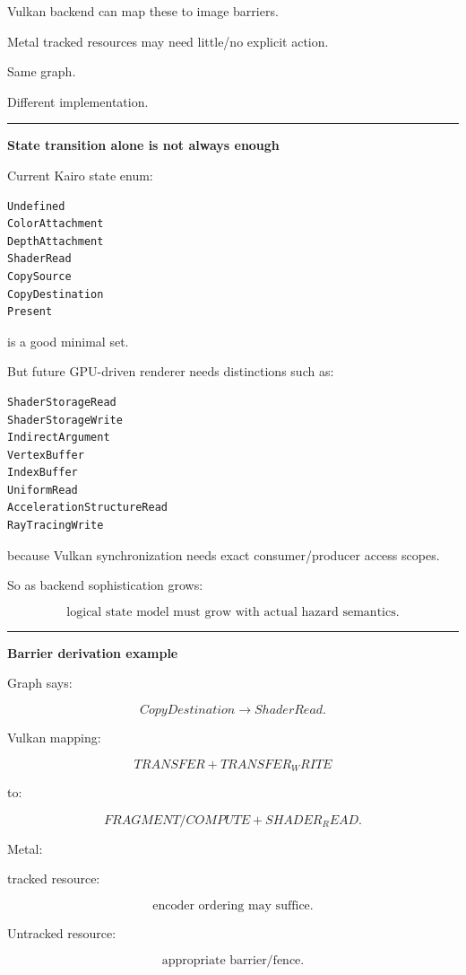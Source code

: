 Vulkan backend can map these to image barriers.

Metal tracked resources may need little/no explicit action.

Same graph.

Different implementation.

\begin{center}\rule{0.5\linewidth}{0.5pt}\end{center}

\textbf{State transition alone is not always enough}

Current Kairo state enum:

\begin{verbatim}
Undefined
ColorAttachment
DepthAttachment
ShaderRead
CopySource
CopyDestination
Present
\end{verbatim}

is a good minimal set.

But future GPU-driven renderer needs distinctions such as:

\begin{verbatim}
ShaderStorageRead
ShaderStorageWrite
IndirectArgument
VertexBuffer
IndexBuffer
UniformRead
AccelerationStructureRead
RayTracingWrite
\end{verbatim}

because Vulkan synchronization needs exact consumer/producer access scopes.

So as backend sophistication grows:

\[
\boxed{
\text{logical state model must grow with actual hazard semantics}.
}
\]

\begin{center}\rule{0.5\linewidth}{0.5pt}\end{center}

\textbf{Barrier derivation example}

Graph says:

\[
CopyDestination
\rightarrow
ShaderRead.
\]

Vulkan mapping:

\[
TRANSFER
+
TRANSFER_WRITE
\]

to:

\[
FRAGMENT/COMPUTE
+
SHADER_READ.
\]

Metal:

tracked resource:

\[
\text{encoder ordering may suffice}.
\]

Untracked resource:

\[
\text{appropriate barrier/fence}.
\]

